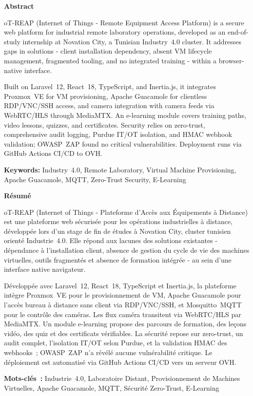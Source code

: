\thispagestyle{empty}
\begin{center}
{\huge\bfseries Abstract}
\end{center}
oT-REAP (Internet of Things - Remote Equipment Access Platform)
is a secure web platform for industrial remote laboratory operations, developed
as an end-of-study internship at Novation City, a Tunisian Industry~4.0
cluster. It addresses gaps in solutions - client installation dependency,
absent VM lifecycle management, fragmented tooling, and no integrated training
- within a browser-native interface.

Built on Laravel~12, React~18, TypeScript, and Inertia.js, it integrates
Proxmox~VE for VM provisioning, Apache Guacamole for clientless RDP/VNC/SSH
access, and camera integration with
camera feeds via WebRTC/HLS through MediaMTX. An e-learning module covers
training paths, video lessons, quizzes, and certificates. Security relies on
zero-trust, comprehensive audit logging, Purdue IT/OT isolation, and HMAC webhook
validation; OWASP~ZAP found no critical vulnerabilities. Deployment runs via
GitHub Actions CI/CD to OVH.

\vspace{0.5cm}
\noindent\textbf{Keywords:} Industry~4.0, Remote Laboratory, Virtual Machine Provisioning, Apache Guacamole, MQTT, Zero-Trust Security, E-Learning

\vspace{0.9cm}
\begin{center}
{\huge\bfseries Résumé}
\end{center}
oT-REAP (Internet of Things - Plateforme d'Accès aux Équipements
à Distance) est une plateforme web sécurisée pour les opérations industrielles
à distance, développée lors d'un stage de fin de études à Novation City,
cluster tunisien orienté Industrie~4.0. Elle répond aux lacunes des solutions
existantes - dépendance à l'installation client, absence de gestion du cycle
de vie des machines virtuelles, outils fragmentés et absence de formation
intégrée - au sein d'une interface native navigateur.

Développée avec Laravel~12, React~18, TypeScript et Inertia.js, la plateforme
intègre Proxmox~VE pour le provisionnement de VM, Apache Guacamole pour
l'accès bureau à distance sans client via RDP/VNC/SSH, et Mosquitto~MQTT pour
le contrôle des caméras. Les flux caméra transitent via
WebRTC/HLS par MediaMTX. Un module e-learning propose des parcours de
formation, des leçons vidéo, des quiz et des certificats vérifiables. La
sécurité repose sur zero-trust, un audit complet, l'isolation IT/OT selon
Purdue, et la validation HMAC des webhooks~; OWASP~ZAP n'a révélé aucune
vulnérabilité critique. Le déploiement est automatisé via GitHub Actions
CI/CD vers un serveur OVH.

\vspace{0.5cm}
\noindent\textbf{Mots-clés~:} Industrie~4.0, Laboratoire Distant, Provisionnement de Machines Virtuelles, Apache Guacamole, MQTT, Sécurité Zero-Trust, E-Learning
\cleardoublepage\cleardoublepage